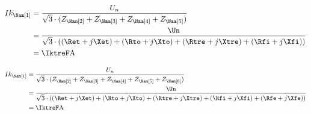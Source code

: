{\FPeval\Ztretest{\Rfe + \Xfe + \yepET + \yepTO + \yepTRE + \yepFI}
\FPifzero{\Ztretest}
\begin{align*}
Ik_{\Nam[1]} &= \frac{U_n}{\sqrt{3}\cdot (Z_{\Nam[2]} + Z_{\Nam[3]} + Z_{\Nam[4]} + Z_{\Nam[5]})} \\
	&= \frac{\Un}{\sqrt{3}\cdot ((\Ret + j\Xet) + (\Rto + j\Xto) + (\Rtre + j\Xtre) + (\Rfi + j\Xfi))}\\
	&= \IktreF \unit{A}
\end{align*}
\else
\FPeval{}
\fi

\FPeval\all{\yepET + \yepTO + \yepTRE + \yepFI + \yepFE}
\FPifzero{\all}
\begin{align*}
Ik_{\Nam[1]} &= \frac{U_n}{\sqrt{3}\cdot (Z_{\Nam[2]} + Z_{\Nam[3]} + Z_{\Nam[4]} + Z_{\Nam[5]} + Z_{\Nam[6]})} \\
	&= \frac{\Un}{\sqrt{3}\cdot ((\Ret + j\Xet) + (\Rto + j\Xto) + (\Rtre + j\Xtre) + (\Rfi + j\Xfi) + (\Rfe + j\Xfe))}\\
	&= \IktreF \unit{A}
\end{align*}
\else
\fi
}


